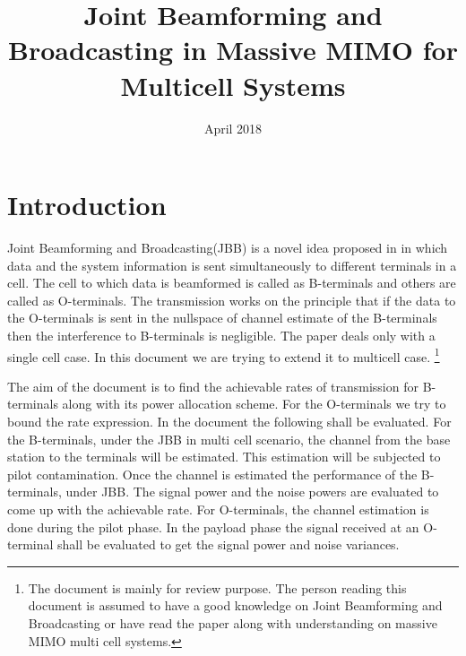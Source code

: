 \documentclass[10pt, a4paper, twoside,fleqn]{article}
\title{Joint Beamforming and Broadcasting in Massive MIMO for Multicell Systems}
\author{}
\date{April 2018}
\begin{document}
\maketitle
 
\section{Introduction}
	Joint Beamforming and Broadcasting(JBB) is a novel idea proposed in \cite{bib:jbb} in which data and the system information is sent simultaneously to different terminals in a cell. The cell to which data is beamformed is called as B-terminals and others are called as O-terminals. The transmission works on the principle that if the data to the O-terminals is sent in the nullspace of channel estimate of the B-terminals then the interference to B-terminals is negligible. The paper \cite{bib:jbb} deals only with a single cell case. In this document we are trying to extend it to multicell case.
\footnote{The document is mainly for review purpose. The person reading this document is assumed to have a good knowledge on Joint Beamforming and Broadcasting or have read the paper \cite{bib:jbb} along with understanding on massive MIMO multi cell systems.}
	
	The aim of the document is to find the achievable rates of transmission for B-terminals along with its power allocation scheme. For the O-terminals we try to bound the rate expression. In the document the following shall be evaluated. For the B-terminals, under the JBB in multi cell scenario, the channel from the base station to the terminals will be estimated. This estimation will be subjected to pilot contamination. Once the channel is estimated the performance of the B-terminals, under JBB. The signal power and the noise powers are evaluated to come up with the achievable rate. For O-terminals, the channel estimation is done during the pilot phase. In the payload phase the signal received at an O-terminal shall be evaluated to get the signal power and noise variances.
\end{document}
